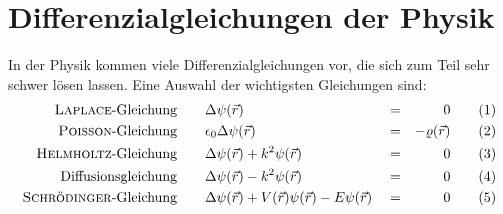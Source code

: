 \documentclass[a4paper,12pt,portrait]{book}
\numberwithin{equation}{section}
\begin{document}
\section{Differenzialgleichungen der Physik}

In der Physik kommen viele Differenzialgleichungen vor, die sich zum Teil sehr schwer lösen lassen. Eine Auswahl der wichtigsten Gleichungen sind:
\begin{align*}
\text{\textsc{Laplace}-Gleichung} \qquad & \Delta\psi(\vec{r}) & &=& 0 \tag{1}\\
\text{\textsc{Poisson}-Gleichung} \qquad & \epsilon_0\Delta\psi (\vec{r})&  &=& -\varrho(\vec{r}) \tag{2}\\
\text{\textsc{Helmholtz}-Gleichung} \qquad & \Delta\psi(\vec{r}) + k^2\psi(\vec{r}) & &=&0 \tag{3} \\
\text{Diffusionsgleichung} \qquad & \Delta\psi(\vec{r}) - k^2\psi(\vec{r}) & &= & 0 \tag{4}\\
\text{\textsc{Schrödinger}-Gleichung} \qquad & \Delta\psi(\vec{r}) + V(\vec{r})\psi(\vec{r}) - E\psi(\vec{r})& &= &0 \tag{5}
\end{align*}
\end{document}
